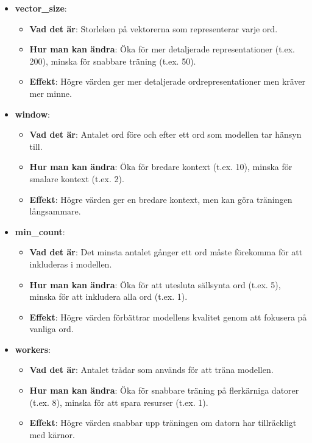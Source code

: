 \documentclass[a4paper, 12pt]{article}
\begin{document}
\begin{enumerate}
    \begin{itemize}
        \item \textbf{vector\_size}:
            \begin{itemize}
                \item \textbf{Vad det är}: Storleken på vektorerna som representerar varje ord.
                \item \textbf{Hur man kan ändra}: Öka för mer detaljerade representationer (t.ex. 200), minska för snabbare träning (t.ex. 50).
                \item \textbf{Effekt}: Högre värden ger mer detaljerade ordrepresentationer men kräver mer minne.
            \end{itemize}
        \break
        \item \textbf{window}:
            \begin{itemize}
                \item \textbf{Vad det är}: Antalet ord före och efter ett ord som modellen tar hänsyn till.
                \item \textbf{Hur man kan ändra}: Öka för bredare kontext (t.ex. 10), minska för smalare kontext (t.ex. 2).
                \item \textbf{Effekt}: Högre värden ger en bredare kontext, men kan göra träningen långsammare.
            \end{itemize}
        
        \item \textbf{min\_count}:
            \begin{itemize}
                \item \textbf{Vad det är}: Det minsta antalet gånger ett ord måste förekomma för att inkluderas i modellen.
                \item \textbf{Hur man kan ändra}: Öka för att utesluta sällsynta ord (t.ex. 5), minska för att inkludera alla ord (t.ex. 1).
                \item \textbf{Effekt}: Högre värden förbättrar modellens kvalitet genom att fokusera på vanliga ord.
            \end{itemize}
        
        \item \textbf{workers}:
            \begin{itemize}
                \item \textbf{Vad det är}: Antalet trådar som används för att träna modellen.
                \item \textbf{Hur man kan ändra}: Öka för snabbare träning på flerkärniga datorer (t.ex. 8), minska för att spara resurser (t.ex. 1).
                \item \textbf{Effekt}: Högre värden snabbar upp träningen om datorn har tillräckligt med kärnor.
            \end{itemize}
    \end{itemize}
    

\end{enumerate}
\end{document}

